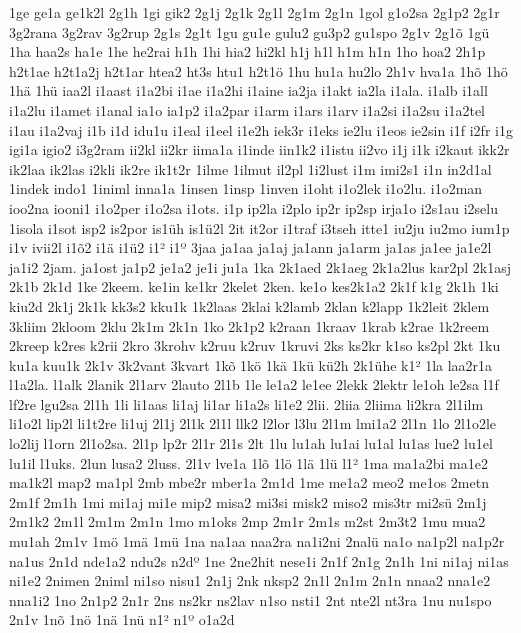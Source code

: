 {1ge
ge1a
ge1k2l
2g1h
1gi
gik2
2g1j
2g1k
2g1l
2g1m
2g1n
1gol
g1o2sa
2g1p2
2g1r
3g2rana
3g2rav
3g2rup
2g1s
2g1t
1gu
gu1e
gulu2
gu3p2
gu1spo
2g1v
2g1^^f5
1g^^fc
1ha
haa2s
ha1e
1he
he2rai
h1h
1hi
hia2
hi2kl
h1j
h1l
h1m
h1n
1ho
hoa2
2h1p
h2t1ae
h2t1a2j
h2t1ar
htea2
ht3s
htu1
h2t1^^f6
1hu
hu1a
hu2lo
2h1v
hva1a
1h^^f5
1h^^f6
1h^^e4
1h^^fc
iaa2l
i1aast
i1a2bi
i1ae
i1a2hi
i1aine
ia2ja
i1akt
ia2la
i1ala.
i1alb
i1all
i1a2lu
i1amet
i1anal
ia1o
ia1p2
i1a2par
i1arm
i1ars
i1arv
i1a2si
i1a2su
i1a2tel
i1au
i1a2vaj
i1b
i1d
idu1u
i1eal
i1eel
i1e2h
iek3r
i1eks
ie2lu
i1eos
ie2sin
i1f
i2fr
i1g
igi1a
igio2
i3g2ram
ii2kl
ii2kr
iima1a
i1inde
iin1k2
i1istu
ii2vo
i1j
i1k
i2kaut
ikk2r
ik2laa
ik2las
i2kli
ik2re
ik1t2r
1ilme
1ilmut
il2pl
1i2lust
i1m
imi2s1
i1n
in2d1al
1indek
indo1
1iniml
inna1a
1insen
1insp
1inven
i1oht
i1o2lek
i1o2lu.
i1o2man
ioo2na
iooni1
i1o2per
i1o2sa
i1ots.
i1p
ip2la
i2plo
ip2r
ip2sp
irja1o
i2s1au
i2selu
1isola
i1sot
isp2
is2por
is1^^fch
is1^^fc2l
2it
it2or
i1traf
i3tseh
itte1
iu2ju
iu2mo
ium1p
i1v
ivii2l
i1^^f52
i1^^e4
i1^^fc2
i1^^b2
i1^^ba
3jaa
ja1aa
ja1aj
ja1ann
ja1arm
ja1as
ja1ee
ja1e2l
ja1i2
2jam.
ja1ost
ja1p2
je1a2
je1i
ju1a
1ka
2k1aed
2k1aeg
2k1a2lus
kar2pl
2k1asj
2k1b
2k1d
1ke
2keem.
ke1in
ke1kr
2kelet
2ken.
ke1o
kes2k1a2
2k1f
k1g
2k1h
1ki
kiu2d
2k1j
2k1k
kk3s2
kku1k
1k2laas
2klai
k2lamb
2klan
k2lapp
1k2leit
2klem
3kliim
2kloom
2klu
2k1m
2k1n
1ko
2k1p2
k2raan
1kraav
1krab
k2rae
1k2reem
2kreep
k2res
k2rii
2kro
3krohv
k2ruu
k2ruv
1kruvi
2ks
ks2kr
k1so
ks2pl
2kt
1ku
ku1a
kuu1k
2k1v
3k2vant
3kvart
1k^^f5
1k^^f6
1k^^e4
1k^^fc
k^^fc2h
2k1^^fche
k1^^b2
1la
laa2r1a
l1a2la.
l1alk
2lanik
2l1arv
2lauto
2l1b
1le
le1a2
le1ee
2lekk
2lektr
le1oh
le2sa
l1f
lf2re
lgu2sa
2l1h
1li
li1aas
li1aj
li1ar
li1a2s
li1e2
2lii.
2liia
2liima
li2kra
2l1ilm
li1o2l
lip2l
li1t2re
li1uj
2l1j
2l1k
2l1l
llk2
l2lor
l3lu
2l1m
lmi1a2
2l1n
1lo
2l1o2le
lo2lij
l1orn
2l1o2sa.
2l1p
lp2r
2l1r
2l1s
2lt
1lu
lu1ah
lu1ai
lu1al
lu1as
lue2
lu1el
lu1il
l1uks.
2lun
lusa2
2luss.
2l1v
lve1a
1l^^f5
1l^^f6
1l^^e4
1l^^fc
l1^^b2
1ma
ma1a2bi
ma1e2
ma1k2l
map2
ma1pl
2mb
mbe2r
mber1a
2m1d
1me
me1a2
meo2
me1os
2metn
2m1f
2m1h
1mi
mi1aj
mi1e
mip2
misa2
mi3si
misk2
miso2
mis3tr
mi2s^^fc
2m1j
2m1k2
2m1l
2m1m
2m1n
1mo
m1oks
2mp
2m1r
2m1s
m2st
2m3t2
1mu
mua2
mu1ah
2m1v
1m^^f6
1m^^e4
1m^^fc
1na
na1aa
naa2ra
na1i2ni
2nal^^fc
na1o
na1p2l
na1p2r
na1us
2n1d
nde1a2
ndu2s
n2d^^ba
1ne
2ne2hit
nese1i
2n1f
2n1g
2n1h
1ni
ni1aj
ni1as
ni1e2
2nimen
2niml
ni1so
nisu1
2n1j
2nk
nksp2
2n1l
2n1m
2n1n
nnaa2
nna1e2
nna1i2
1no
2n1p2
2n1r
2ns
ns2kr
ns2lav
n1so
nsti1
2nt
nte2l
nt3ra
1nu
nu1spo
2n1v
1n^^f5
1n^^f6
1n^^e4
1n^^fc
n1^^b2
n1^^ba
o1a2d
}
